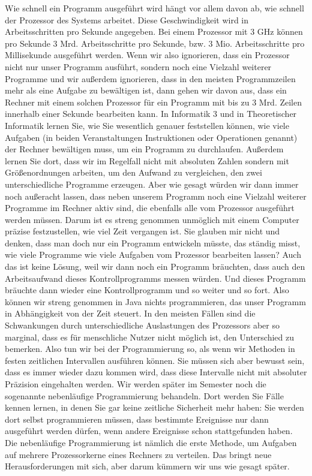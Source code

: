 Wie schnell ein Programm ausgeführt wird hängt vor allem davon ab, wie schnell der Prozessor des Systems arbeitet. Diese Geschwindigkeit wird in Arbeitsschritten pro Sekunde angegeben. Bei einem Prozessor mit 3 GHz können pro Sekunde 3 Mrd. Arbeitsschritte pro Sekunde, bzw. 3 Mio. Arbeitsschritte pro Millisekunde ausgeführt werden. Wenn wir also ignorieren, dass ein Prozessor nicht nur unser Programm ausführt, sondern noch eine Vielzahl weiterer Programme und wir außerdem ignorieren, dass in den meisten Programmzeilen mehr als eine Aufgabe zu bewältigen ist, dann gehen wir davon aus, dass ein Rechner mit einem solchen Prozessor für ein Programm mit bis zu 3 Mrd. Zeilen innerhalb einer Sekunde bearbeiten kann. 
In Informatik 3 und in Theoretischer Informatik lernen Sie, wie Sie wesentlich genauer feststellen können, wie viele Aufgaben (in beiden Veranstaltungen Instruktionen oder Operationen genannt) der Rechner bewältigen muss, um ein Programm zu durchlaufen. Außerdem lernen Sie dort, dass wir im Regelfall nicht mit absoluten Zahlen sondern mit Größenordnungen arbeiten, um den Aufwand zu vergleichen, den zwei unterschiedliche Programme erzeugen.
Aber wie gesagt würden wir dann immer noch außeracht lassen, dass neben unserem Programm noch eine Vielzahl weiterer Programme im Rechner aktiv sind, die ebenfalls alle vom Prozessor ausgeführt werden müssen. Darum ist es streng genommen unmöglich mit einem Computer präzise festzustellen, wie viel Zeit vergangen ist. Sie glauben mir nicht und denken, dass man doch nur ein Programm entwickeln müsste, das ständig misst, wie viele Programme wie viele Aufgaben vom Prozessor bearbeiten lassen? Auch das ist keine Lösung, weil wir dann noch ein Programm bräuchten, dass auch den Arbeitsaufwand dieses Kontrollprogramms messen würden. Und dieses Programm bräuchte dann wieder eine Kontrollprogramm und so weiter und so fort.
Also können wir streng genommen in Java nichts programmieren, das unser Programm in Abhängigkeit von der Zeit steuert. In den meisten Fällen sind die Schwankungen durch unterschiedliche Auslastungen des Prozessors aber so marginal, dass es für menschliche Nutzer nicht möglich ist, den Unterschied zu bemerken. Also tun wir bei der Programmierung so, als wenn wir Methoden in festen zeitlichen Intervallen ausführen können. Sie müssen sich aber bewusst sein, dass es immer wieder dazu kommen wird, dass diese Intervalle nicht mit absoluter Präzision eingehalten werden.
Wir werden später im Semester noch die sogenannte nebenläufige Programmierung behandeln. Dort werden Sie Fälle kennen lernen, in denen Sie gar keine zeitliche Sicherheit mehr haben: Sie werden dort selbst programmieren müssen, dass bestimmte Ereignisse nur dann ausgeführt werden dürfen, wenn andere Ereignisse schon stattgefunden haben. Die nebenläufige Programmierung ist nämlich die erste Methode, um Aufgaben auf mehrere Prozessorkerne eines Rechners zu verteilen. Das bringt neue Herausforderungen mit sich, aber darum kümmern wir uns wie gesagt später.
